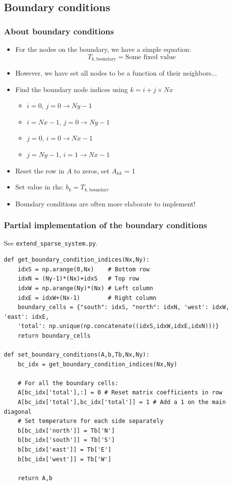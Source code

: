 \subsection*{Boundary conditions}
\begin{frame}[fragile]
  \frametitle{About boundary conditions}
  \begin{itemize}
    \item For the nodes on the boundary, we have a simple equation:
    \[
      T_{k,\text{boundary}} = \text{Some fixed value}
      \]
      \item However, we have set all nodes to be a function of their neighbors...
      \item Find the boundary node indices using $k = i + j\times Nx$ %
      \begin{itemize}
        \item $i = 0$, $j = 0\rightarrow Ny-1$
        \item $i = Nx-1$, $j = 0\rightarrow Ny-1$
        \item $j = 0$, $i = 0\rightarrow Nx-1$
        \item $j = Ny-1$, $i = 1\rightarrow Nx-1$
      \end{itemize}
      \item Reset the row in $A$ to zeros, set $A_{kk}$ = 1
      \item Set value in rhs: $b_k = T_{k,\text{boundary}}$
      \item Boundary conditions are often more elaborate to implement!
  \end{itemize}
\end{frame}
  
\begin{frame}[fragile]
  \frametitle{Partial implementation of the boundary conditions}
  See \lstinline$extend_sparse_system.py$.
  \begin{lstlisting}[]
def get_boundary_condition_indices(Nx,Ny):
    idxS = np.arange(0,Nx)    # Bottom row
    idxN = (Ny-1)*(Nx)+idxS   # Top row
    idxW = np.arange(Ny)*(Nx) # Left column
    idxE = idxW+(Nx-1)        # Right column
    boundary_cells = {"south": idxS, "north": idxN, 'west': idxW, 'east': idxE,
    'total': np.unique(np.concatenate((idxS,idxW,idxE,idxN)))}
    return boundary_cells

def set_boundary_conditions(A,b,Tb,Nx,Ny):
    bc_idx = get_boundary_condition_indices(Nx,Ny)

    # For all the boundary cells:
    A[bc_idx['total'],:] = 0 # Reset matrix coefficients in row
    A[bc_idx['total'],bc_idx['total']] = 1 # Add a 1 on the main diagonal
    # Set temperature for each side separately
    b[bc_idx['north']] = Tb['N']
    b[bc_idx['south']] = Tb['S']
    b[bc_idx['east']] = Tb['E']
    b[bc_idx['west']] = Tb['W']
    
    return A,b 
  \end{lstlisting}
\end{frame}


